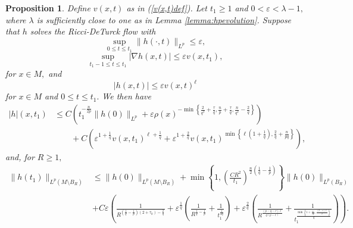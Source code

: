 \documentclass[12pt]{amsart}
\renewcommand{\1}{{\mathbf 1}}
\newcommand{\eps}{{\varepsilon}}
\newtheorem{prop}[thm]{Proposition}
\theoremstyle{others}
\numberwithin{equation}{section}
\begin{document}
\begin{prop}
Define $v(x,t)$ as in (\ref{v(x,t)def}). Let $t_1 \geq 1$ and $0 < \eps < \lambda - 1,$ where $\lambda$ is sufficiently close to one as in Lemma \ref{lemma:hpevolution}. Suppose that $h$ solves the Ricci-DeTurck flow with
\begin{equation}\label{Lpbootstrap:Lpetaassumption}
    \sup_{0 \leq t \leq t_1} \|h(\cdot,t) \|_{L^p} \leq \eps,
\end{equation}
\begin{equation}\label{Lpbootstrap:gradassumption}
    \sup_{t_1 - 1 \leq t \leq t_1} | \nabla h(x,t) | \leq \eps v(x,t_1), %
\end{equation}
for $x \in M,$ and
\begin{equation}\label{Lpbootstrap:hpointwiseassumption}
    | h(x,t) | \leq \eps v(x,t)^\ell
\end{equation}
for $x\in M$ and $0 \leq t \leq t_1.$
We then have
\begin{equation}\label{Lpbootstrap:Linftybound}
\begin{split}
    |h|(x,t_1) & \leq C \left( t_1^{-\frac{n}{2p}} \| h(0) \|_{L^p} + \eps \rho(x)^{- \min \left\{ \frac{2}{q^2} + \frac{\tau}{q}, \frac{n}{p} + \frac{\tau}{q}, \frac{n}{q^2} - \frac{2}{q} \right\} } \right) \\
    & \qquad + C \left( \eps^{1 + \frac{1}{q}} v(x,t_1)^{\ell + \frac{1}{q}} + \eps^{1 + \frac{2}{q} } v(x,t_1)^{\min\left\{ \ell \left( 1 + \frac{1}{q} \right), \frac{2}{q} + \frac{n}{pq} \right\} } \right),
    \end{split}
\end{equation}
and, for $R \geq 1,$
        \begin{equation}\label{Lpbootstrap:Lpbound}
        \begin{split}
        \|h(t_1) \|_{L^p(M \setminus B_R)} & \leq \|h(0) \|_{L^p ( M \setminus B_R )} + \min \left\{ 1, \left( \frac{C R^2}{t_1 } \right)^{\frac{n}{2}\left( \frac{1}{q} - \frac{1}{p} \right)} \right\} \|h(0)\|_{L^p(B_R)} \\
        & + C \eps \left( \frac{1}{R^{\left( \frac{1}{q} - \frac{1}{p} \right) \left(2 + \tau_0 \right) - \frac{2}{q} } } + \eps^{\frac{1}{q}} \left( \frac{1}{R^{\frac{1}{q} - \frac{1}{p} }} + \frac{1}{t_1^{\frac{1}{2q}} } \right) + \eps^{\frac{2}{q}} \left( \frac{1}{R^{ \frac{ \left( p - q - r \right) \ell}{q(p-r)} }} + \frac{1}{t_1^{\frac{\min\left\{1 + \frac{nr}{2p} , \frac{(2 - r)\ell}{2} \right\} }{q} } } \right)\right).
        \end{split}
    \end{equation}
\end{prop}
\end{document}
